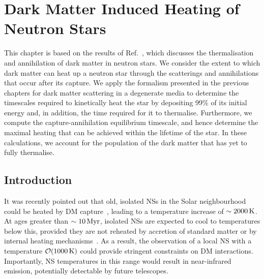 \graphicspath{{img/thermalisation/}}

\chapter{Dark Matter Induced Heating of Neutron Stars}
\label{chapter:heating}

\begin{synopsis}
This chapter is based on the results of Ref.~\cite{Bell:2023ysh_dec_ThermalizationAnnihilationDark}, which discusses the thermalisation and annihilation of dark matter in neutron stars. We consider the extent to which dark matter can heat up a neutron star through the scatterings and annihilations that occur after its capture.  We apply the formalism presented in the previous chapters for dark matter scattering in a degenerate media to determine the timescales required to kinetically heat the star by depositing 99\% of its initial energy and, in addition, the time required for it to thermalise. Furthermore, we compute the capture-annihilation equilibrium timescale, and hence determine the maximal heating that can be achieved within the lifetime of the star. In these calculations, we account for the population of the dark matter that has yet to fully thermalise. 
\end{synopsis}




\section{Introduction}
\label{ch6:sec:introduction}

It was recently pointed out that old, isolated NSs in the Solar neighbourhood could be heated by DM capture~\cite{Baryakhtar:2017dbj_sep_DarkKineticHeating}, leading to a temperature increase of $\sim 2000{\rm \,K}$. 
At ages greater than $\sim 10{\rm \,Myr}$, isolated NSs are expected to cool to temperatures below this, provided they are not reheated by accretion of standard matter or by internal heating mechanisms~\cite{Gonzalez:2010ta_Internalheatingold}.
As a result, the observation of a local NS with a temperature $\mathcal{O}(1000{\rm \,K})$ could provide stringent constraints on DM interactions. Importantly,
NS temperatures in this range would result in near-infrared emission, potentially detectable by future telescopes.


